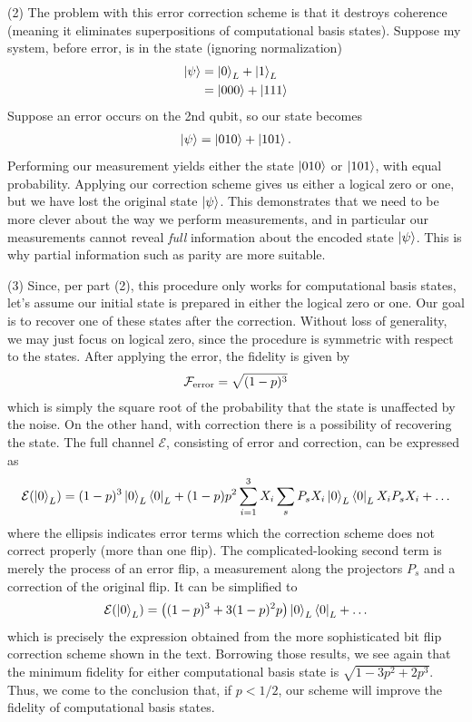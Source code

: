 \documentclass{book}
\newcommand{\mc}[1]{\mathcal{#1}}
\begin{document}
    (2) The problem with this error correction scheme is that it destroys coherence (meaning it eliminates superpositions of computational basis states). Suppose my system, before error, is in the state (ignoring normalization)
    \begin{align}
        \ket{\psi} &= \ket{0}_L + \ket{1}_L \\
        &= \ket{000}+\ket{111}
    \end{align}
    Suppose an error occurs on the 2nd qubit, so our state becomes
    \begin{align}
        \ket{\psi} = \ket{010} + \ket{101}.
    \end{align}
    Performing our measurement yields either the state $\ket{010}$ or $\ket{101}$, with equal probability. Applying our correction scheme gives us either a logical zero or one, but we have lost the original state $\ket{\psi}$. This demonstrates that we need to be more clever about the way we perform measurements, and in particular our measurements cannot reveal \emph{full} information about the encoded state $\ket{\psi}$. This is why partial information such as parity are more suitable. 
    
    (3) Since, per part (2), this procedure only works for computational basis states, let's assume our initial state is prepared in either the logical zero or one. Our goal is to recover one of these states after the correction. Without loss of generality, we may just focus on logical zero, since the procedure is symmetric with respect to the states. After applying the error, the fidelity is given by 
    \begin{align}
        \mc{F}_{\rm error} = \sqrt{(1-p)^3}
    \end{align}
    which is simply the square root of the probability that the state is unaffected by the noise. On the other hand, with correction there is a possibility of recovering the state. The full channel $\mc{E}$, consisting of error and correction, can be expressed as
    \begin{align}
        \mc{E}(\ket{0}_L) = (1-p)^3\ket{0}_L\bra{0}_L + (1-p)p^2 \sum_{i=1}^3 X_i \sum_s P_s X_i \ket{0}_L\bra{0}_L X_i P_s X_i + \dots
    \end{align}
    where the ellipsis indicates error terms which the correction scheme does not correct properly (more than one flip). The complicated-looking second term is merely the process of an error flip, a measurement along the projectors $P_s$ and a correction of the original flip. It can be simplified to 
    \begin{align}
        \mc{E}(\ket{0}_L) = \left((1-p)^3+3(1-p)^2p\right)\ket{0}_L\bra{0}_L + \dots
    \end{align}
    which is precisely the expression obtained from the more sophisticated bit flip correction scheme shown in the text. Borrowing those results, we see again that the minimum fidelity for either computational basis state is $\sqrt{1-3p^2 + 2p^3}$. Thus, we come to the conclusion that, if $p < 1/2$, our scheme will improve the fidelity of computational basis states.
    
\end{document}
